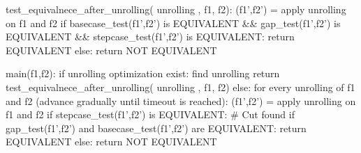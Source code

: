 
test_equivalnece_after_unrolling( unrolling , f1, f2):
	(f1',f2') = apply unrolling on f1 and f2
	if basecase_test(f1',f2') is EQUIVALENT && 
		   gap_test(f1',f2') is EQUIVALENT 	&& 
		   stepcase_test(f1',f2') is EQUIVALENT:
		return EQUIVALENT
	else:	
		return NOT EQUIVALENT
	
main(f1,f2):
	if unrolling optimization exist:
		find unrolling
		return test_equivalnece_after_unrolling( unrolling , f1, f2)
	else:
		for every unrolling of f1 and f2 (advance gradually until timeout is reached):
			(f1',f2') = apply unrolling on f1 and f2
			if stepcase_test(f1',f2') is EQUIVALENT: 
                                # Cut found
				if gap_test(f1',f2') and basecase_test(f1',f2') are EQUIVALENT:
					return EQUIVALENT
				else:
					return NOT EQUIVALENT

